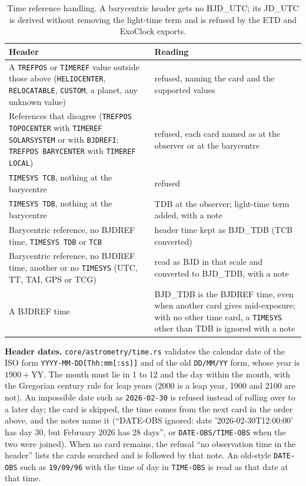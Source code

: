 \documentclass[11pt,a4paper]{article}
\newcommand{\code}[1]{\texttt{\small #1}}
\begin{document}
    \begin{table}[H]
        \centering
        \small
        \begin{tabularx}{\textwidth}{>{\raggedright\arraybackslash}X>{\raggedright\arraybackslash}X}
            \toprule
            \textbf{Header} & \textbf{Reading} \\
            \midrule
            A \code{TREFPOS} or \code{TIMEREF} value outside those above (\code{HELIOCENTER}, \code{RELOCATABLE}, \code{CUSTOM}, a planet, any unknown value) & refused, naming the card and the supported values \\
            References that disagree (\code{TREFPOS TOPOCENTER} with \code{TIMEREF SOLARSYSTEM} or with \code{BJDREFI}; \code{TREFPOS BARYCENTER} with \code{TIMEREF LOCAL}) & refused, each card named as at the observer or at the barycentre \\
            \code{TIMESYS TCB}, nothing at the barycentre & refused \\
            \code{TIMESYS TDB}, nothing at the barycentre & TDB at the observer; light-time term added, with a note \\
            Barycentric reference, no BJDREF time, \code{TIMESYS TDB} or \code{TCB} & header time kept as BJD\_TDB (TCB converted) \\
            Barycentric reference, no BJDREF time, another or no \code{TIMESYS} (UTC, TT, TAI, GPS or TCG) & read as BJD in that scale and converted to BJD\_TDB, with a note \\
            A BJDREF time & BJD\_TDB is the BJDREF time, even when another card gives mid-exposure; with no other time card, a \code{TIMESYS} other than TDB is ignored with a note \\
            \bottomrule
        \end{tabularx}
        \caption{Time reference handling. A barycentric header gets no HJD\_UTC; its JD\_UTC is derived without removing the light-time term and is refused by the ETD and ExoClock exports.}
    \end{table}

    \textbf{Header dates.} \code{core/astrometry/time.rs} validates the calendar date of the ISO form \code{YYYY-MM-DD[Thh:mm[:ss]]} and of the old \code{DD/MM/YY} form, whose year is $1900 + \text{YY}$. The month must lie in 1 to 12 and the day within the month, with the Gregorian century rule for leap years (2000 is a leap year, 1900 and 2100 are not). An impossible date such as \code{2026-02-30} is refused instead of rolling over to a later day; the card is skipped, the time comes from the next card in the order above, and the notes name it (``DATE-OBS ignored: date '2026-02-30T12:00:00' has day 30, but February 2026 has 28 days'', or \code{DATE-OBS/TIME-OBS} when the two were joined). When no card remains, the refusal ``no observation time in the header'' lists the cards searched and is followed by that note. An old-style \code{DATE-OBS} such as \code{19/09/96} with the time of day in \code{TIME-OBS} is read as that date at that time.
\end{document}
